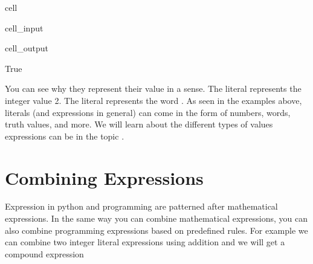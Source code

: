 \documentclass[letterpaper,10pt,english]{jupyterBook}
\begin{document}
\begin{sphinxuseclass}{cell}\begin{sphinxVerbatimInput}

\begin{sphinxuseclass}{cell_input}
\begin{sphinxVerbatim}[commandchars=\\\{\}]
\end{sphinxVerbatim}

\end{sphinxuseclass}\end{sphinxVerbatimInput}
\begin{sphinxVerbatimOutput}

\begin{sphinxuseclass}{cell_output}
\begin{sphinxVerbatim}[commandchars=\\\{\}]
True
\end{sphinxVerbatim}

\end{sphinxuseclass}\end{sphinxVerbatimOutput}

\end{sphinxuseclass}
\sphinxAtStartPar
You can see why they represent their value in a  sense. The literal   represents the integer value 2. The literal  represents the word . As seen in the examples above, literals (and expressions in general) can come in the form of numbers, words, truth values, and more. We will learn about the different types of values expressions can be in the topic .


\section{Combining Expressions}
\label{\detokenize{expressions:combining-expressions}}
\sphinxAtStartPar
Expression in python and programming are patterned after mathematical expressions. In the same way you can combine mathematical expressions, you can also combine programming expressions based on predefined rules. For example we can combine two integer literal expressions using addition and we will get a compound expression
\end{document}
